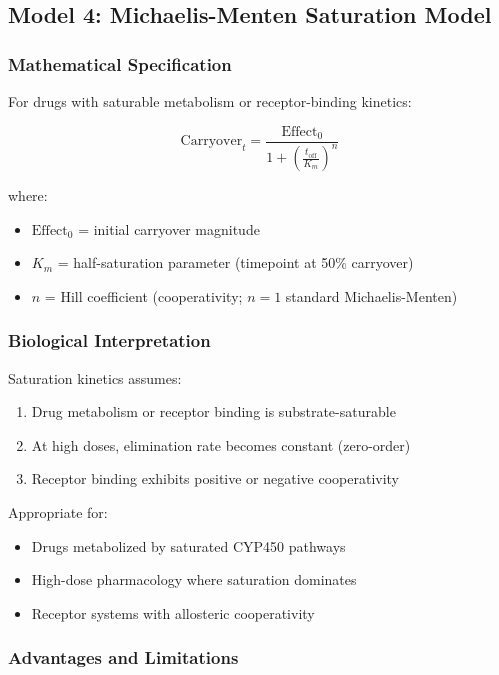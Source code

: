 \documentclass[11pt,a4paper]{article}
\begin{document}
\subsection{Model 4: Michaelis-Menten Saturation Model}
\label{subsec:michaelis}

\subsubsection{Mathematical Specification}

For drugs with saturable metabolism or receptor-binding kinetics:

\begin{equation}
  \text{Carryover}_t = \frac{\text{Effect}_0}{1 + \left(\frac{t_{\text{off}}}{K_m}\right)^n}
\end{equation}

where:
\begin{itemize}
  \item $\text{Effect}_0$ = initial carryover magnitude
  \item $K_m$ = half-saturation parameter (timepoint at 50\% carryover)
  \item $n$ = Hill coefficient (cooperativity; $n=1$ standard Michaelis-Menten)
\end{itemize}

\subsubsection{Biological Interpretation}

Saturation kinetics assumes:
\begin{enumerate}
  \item Drug metabolism or receptor binding is substrate-saturable
  \item At high doses, elimination rate becomes constant (zero-order)
  \item Receptor binding exhibits positive or negative cooperativity
\end{enumerate}

Appropriate for:
\begin{itemize}
  \item Drugs metabolized by saturated CYP450 pathways
  \item High-dose pharmacology where saturation dominates
  \item Receptor systems with allosteric cooperativity
\end{itemize}

\subsubsection{Advantages and Limitations}
\end{document}
